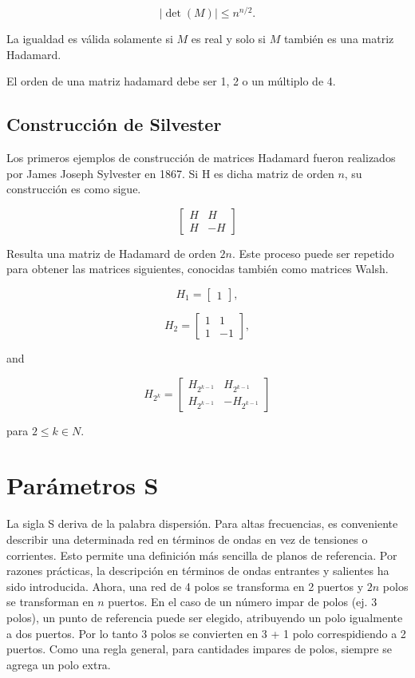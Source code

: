 $$ |\operatorname{det}(M)| \leq n^{n/2}. $$

La igualdad es válida solamente si $M$ es real y solo si $M$ también es una matriz Hadamard.

El orden de una matriz hadamard debe ser 1, 2 o un múltiplo de 4.

\subsection{Construcción de Silvester}

Los primeros ejemplos de construcción de matrices Hadamard fueron realizados por James Joseph Sylvester en 1867. Si H es 
dicha matriz de orden $n$, su construcción es como sigue.

$$ \begin{bmatrix} H & H\\H & -H\end{bmatrix} $$

Resulta una matriz de Hadamard de orden $2n$. Este proceso puede ser repetido para obtener las matrices siguientes, 
conocidas también como matrices Walsh. 

$$ H_1 = \begin{bmatrix} 1 \end{bmatrix}, $$

$$  H_2 = \begin{bmatrix} 1 & 1 \\ 1 & -1 \end{bmatrix}, $$

and

$$ H_{2^k} = \begin{bmatrix} H_{2^{k-1}} & H_{2^{k-1}}\\ H_{2^{k-1}} & -H_{2^{k-1}}\end{bmatrix} $$

para $2 \le k \in N$.


\section{Parámetros S} \label{sc:appendixSParam}

La sigla S deriva de la palabra dispersión. Para altas frecuencias, es conveniente describir una
determinada red en términos de ondas en vez de tensiones o corrientes. Esto permite una definición más
sencilla de planos de referencia. Por razones prácticas, la descripción en términos de ondas entrantes
y salientes ha sido introducida. Ahora, una red de 4 polos se transforma en 2 puertos y $2n$ polos se
transforman en $n$ puertos. En el caso de un número impar de polos (ej. 3 polos), un punto de referencia
puede ser elegido, atribuyendo un polo igualmente a dos puertos. Por lo tanto 3 polos se convierten en
3 + 1 polo correspidiendo a 2 puertos. Como una regla general, para cantidades impares de polos, siempre
se agrega un polo extra.

